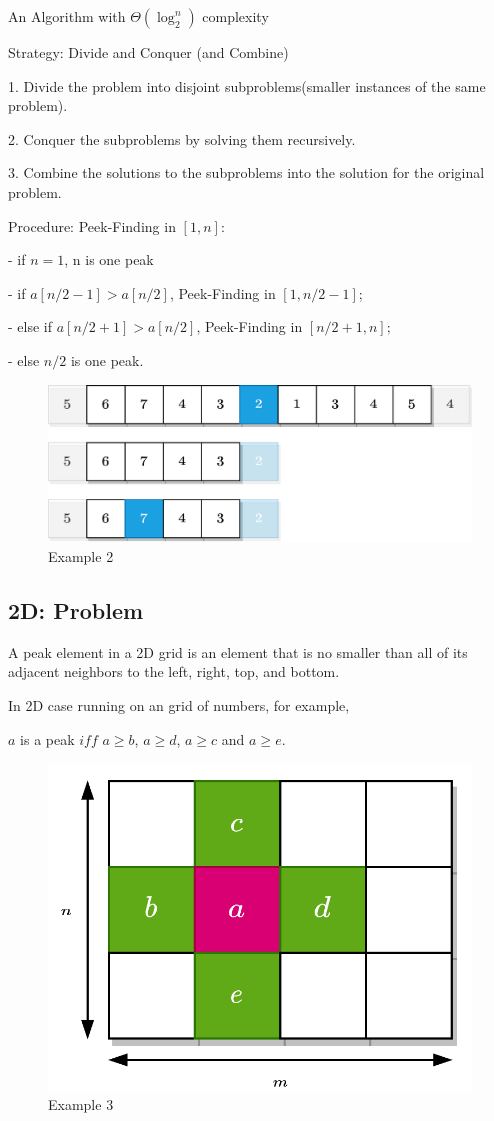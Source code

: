 \documentclass[12pt]{ctexart}
\begin{document}
An Algorithm with $\Theta(\log_2^n)$ complexity

Strategy: Divide and Conquer (and Combine)

1. Divide the problem into disjoint subproblems(smaller instances of the same problem).

2. Conquer the subproblems by solving them recursively. 

3. Combine the solutions to the subproblems into the solution for the original problem.\newline

Procedure: Peek-Finding in $[1, n]$:

- if $n = 1$, n is one peak

- if $a[n/2-1] > a[n/2]$, Peek-Finding in $[1, n/2-1]$;

- else if $a[n/2+1] > a[n/2]$, Peek-Finding in $[n/2+1, n]$;

- else $n/2$ is one peak.

\begin{figure}[htbp]
    \centering
    \includegraphics[width=0.75\linewidth]{assets/lec01-1d-eg2.png}
    \caption{Example 2}
\end{figure}

\subsection{2D: Problem}

A peak element in a 2D grid is an element that is no smaller than all of its adjacent neighbors to the left, right, top, and bottom.

In 2D case running on an grid of numbers, for example, 

$a$ is a peak $\textit{iff}$ $a \ge b$, $a \ge d$, $a \ge c$ and $a \ge e$. 

\begin{figure}[htbp]
    \centering
    \includegraphics[width=0.25\linewidth]{assets/lec01-2d.png}
    \caption{Example 3}
\end{figure}
\end{document}
